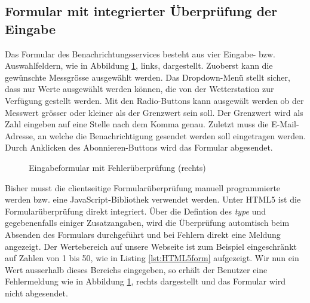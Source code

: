 \subsection{Formular mit integrierter Überprüfung der Eingabe}
Das Formular des Benachrichtungsservices besteht aus vier Eingabe- bzw. Auswahlfeldern, wie in Abbildung \ref{img:notificationFE}, links, dargestellt. Zuoberst kann die gewünschte Messgrösse ausgewählt werden. Das Dropdown-Menü stellt sicher, dass nur Werte ausgewählt werden können, die von der Wetterstation zur Verfügung gestellt werden. Mit den Radio-Buttons kann ausgewält werden ob der Messwert grösser oder kleiner als der Grenzwert sein soll. Der Grenzwert wird als Zahl eingeben auf eine Stelle nach dem Komma genau. Zuletzt muss die E-Mail-Adresse, an welche die Benachrichtigung gesendet werden soll eingetragen werden. Durch Anklicken des Abonnieren-Buttons wird das Formular abgesendet.

\begin{figure}[h!]
	\centering
	\caption{Eingabeformular mit Fehlerüberprüfung (rechts)}
	\label{img:notificationFE}
\end{figure}

Bisher musst die clientseitige Formularüberprüfung manuell programmierte werden bzw. eine JavaScript-Bibliothek verwendet werden. Unter HTML5 ist die Formularüberprüfung direkt integriert. Über die Defintion des \textit{type} und gegebenenfalls einiger Zusatzangaben, wird die  Überprüfung automtisch beim Absenden des Formulars durchgeführt und bei Fehlern direkt eine Meldung angezeigt. Der Wertebereich auf unsere Webseite ist zum Beispiel eingeschränkt auf Zahlen von 1 bis 50, wie in Listing \ref{lst:HTML5form} aufgezeigt. Wir nun ein Wert ausserhalb dieses Bereichs eingegeben, so erhält der Benutzer eine Fehlermeldung wie in Abbildung \ref{img:notificationFE}, rechts dargestellt und das Formular wird nicht abgesendet.

